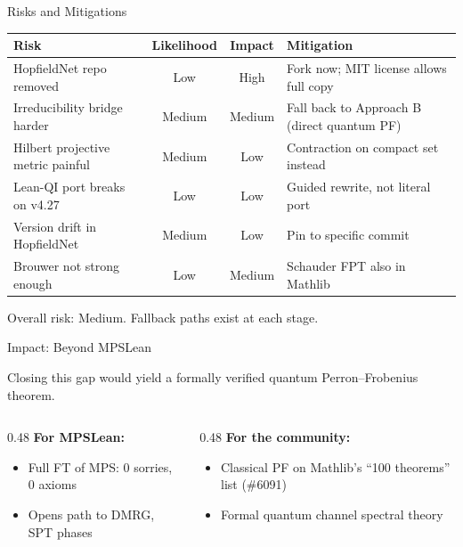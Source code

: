 \documentclass[aspectratio=169,10pt]{beamer}
\begin{document}
\begin{frame}{Risks and Mitigations}

\renewcommand{\arraystretch}{1.15}
\begin{tabular}{>{\footnotesize}p{3.4cm} >{\footnotesize}c >{\footnotesize}c >{\footnotesize}p{4.2cm}}
\textbf{Risk} & \textbf{Likelihood} & \textbf{Impact} & \textbf{Mitigation} \\
\midrule
HopfieldNet repo removed & Low & High & Fork now; MIT license allows full copy \\
Irreducibility bridge harder & \textcolor{amber}{Medium} & \textcolor{amber}{Medium} & Fall back to Approach B (direct quantum PF) \\
Hilbert projective metric painful & \textcolor{amber}{Medium} & Low & Contraction on compact set instead \\
Lean-QI port breaks on v4.27 & Low & Low & Guided rewrite, not literal port \\
Version drift in HopfieldNet & \textcolor{amber}{Medium} & Low & Pin to specific commit \\
Brouwer not strong enough & Low & \textcolor{amber}{Medium} & Schauder FPT also in Mathlib \\
\end{tabular}

\vspace{0.4em}
Overall risk: \textcolor{amber}{Medium}. Fallback paths exist at each stage.
\end{frame}

\begin{frame}{Impact: Beyond MPSLean}

Closing this gap would yield a formally verified quantum Perron--Frobenius theorem.

\vspace{0.3em}
\begin{columns}[T]
\begin{column}{0.48\textwidth}
\textbf{For MPSLean:}
\begin{itemize}\small\itemsep0pt
  \item Full FT of MPS: 0 sorries, 0 axioms
  \item Opens path to DMRG, SPT phases
\end{itemize}
\end{column}
\begin{column}{0.48\textwidth}
\textbf{For the community:}
\begin{itemize}\small\itemsep0pt
  \item Classical PF on Mathlib's ``100 theorems'' list (\#6091)
  \item Formal quantum channel spectral theory
\end{itemize}
\end{column}
\end{columns}
\end{frame}
\end{document}
